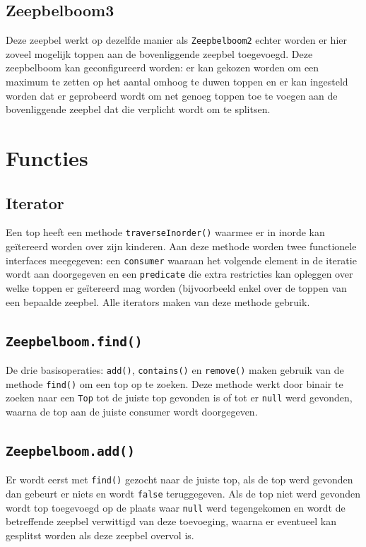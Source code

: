 \documentclass[12pt]{article}
\begin{document}
    \subsection{Zeepbelboom3}
    Deze zeepbel werkt op dezelfde manier als {\tt Zeepbelboom2} echter worden er hier
    zoveel mogelijk toppen aan de bovenliggende zeepbel toegevoegd. Deze zeepbelboom
    kan geconfigureerd worden: er kan gekozen worden om een maximum te zetten op het 
    aantal omhoog te duwen toppen en er kan ingesteld worden dat er geprobeerd wordt
    om net genoeg toppen toe te voegen aan de bovenliggende zeepbel dat die verplicht
    wordt om te splitsen.  
    \section{Functies}
    \subsection{Iterator}
    Een top heeft een methode {\tt traverseInorder()} waarmee er in inorde kan
    geïtereerd worden over zijn kinderen. Aan deze methode worden twee functionele
    interfaces meegegeven: een {\tt consumer} waaraan het volgende element in de iteratie
    wordt aan doorgegeven en een {\tt predicate} die extra restricties kan opleggen over
    welke toppen er geïtereerd mag worden (bijvoorbeeld enkel over de toppen van een
    bepaalde zeepbel.
    Alle iterators maken van deze methode gebruik.
    \subsection{\tt Zeepbelboom.find()}
    De drie basisoperaties: {\tt add()}, {\tt contains()} en {\tt remove()} maken gebruik
    van de methode {\tt find()} om een top op te zoeken. Deze methode werkt door binair
    te zoeken naar een {\tt Top} tot de juiste top gevonden is of tot er {\tt null} werd
    gevonden, waarna de top aan de juiste consumer wordt doorgegeven.
    \subsection{\tt Zeepbelboom.add()}
    Er wordt eerst met {\tt find()} gezocht naar de juiste top, als de top werd gevonden
    dan gebeurt er niets en wordt {\tt false} teruggegeven. Als de top niet werd gevonden
    wordt top toegevoegd op de plaats waar {\tt null} werd tegengekomen en wordt de
    betreffende zeepbel verwittigd van deze toevoeging, waarna er eventueel kan gesplitst
    worden als deze zeepbel overvol is.
\end{document}
